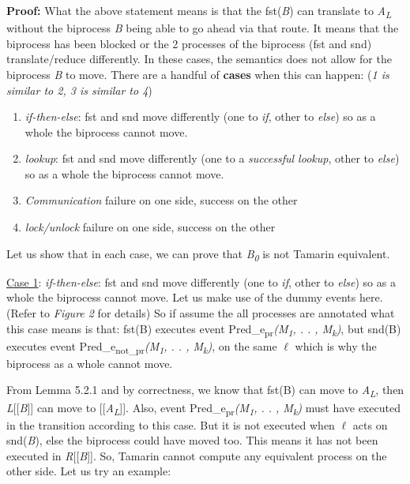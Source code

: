 \documentclass[11pt]{article}
\begin{document}
{\bf Proof: }What the above statement means is that the fst({\it B}) can translate to {\it A\textsubscript{L}} without the biprocess {\it B} being able to go ahead via that route. It means that the biprocess has been blocked or the 2 processes of the biprocess (fst and snd) translate/reduce differently. In these cases, the semantics does not allow for the biprocess {\it B} to move. There are a handful of {\bf cases} when this can happen: ({\it 1 is similar to 2, 3 is similar to 4})
\begin{enumerate}
  \item {\it if-then-else}: fst and snd move differently (one to {\it if}, other to {\it else}) so as a whole the biprocess \hspace*{58pt}cannot move.
  \vspace{-4pt}
  \item {\it lookup}: fst and snd move differently (one to a {\it successful lookup}, other to {\it else}) so as a \hspace*{42pt}whole the biprocess cannot move.
  \vspace{-4pt}
  \item {\it Communication} failure on one side, success on the other
  \vspace{-4pt}
  \item {\it lock/unlock} failure on one side, success on the other\newline
\end{enumerate}  

Let us show that in each case, we can prove that {\it B\textsubscript{0}} is not Tamarin equivalent.\newline

\underline{Case 1}:  {\it if-then-else}: fst and snd move differently (one to {\it if}, other to {\it else}) so as a whole the biprocess cannot move. Let us make use of the dummy events here. (Refer to {\it Figure 2} for details) So if assume the all processes are annotated what this case means is that: fst(B) executes event Pred\_e\textsubscript{pr}{\it (M\textsubscript{1}, . . , M\textsubscript{k})}, but snd(B) executes event Pred\_e\textsubscript{not\_pr}{\it (M\textsubscript{1}, . . , M\textsubscript{k})}, on the same $\ell$ which is why the biprocess as a whole cannot move.

From Lemma 5.2.1 and by correctness, we know that fst(B) can move to {\it A\textsubscript{L}}, then {\it L}[[{\it B}]] can move to [[{\it A\textsubscript{L}}]]. Also, event Pred\_e\textsubscript{pr}{\it (M\textsubscript{1}, . . , M\textsubscript{k})} must have executed in the transition according to this case. But it is not executed when $\ell$ acts on snd({\it B}), else the biprocess could have moved too. This means it has not been executed in {\it R}[[{\it B}]]. So, Tamarin cannot compute any equivalent process on the other side. Let us try an example:
\end{document}
